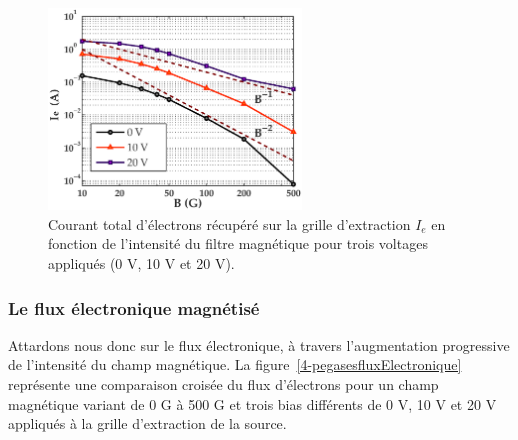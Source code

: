 \begin{refsection}
\begin{figure}[!htbp]
	\centering
	\includegraphics[width=0.6\textwidth]{figures/4-pegasesVarMagCourantParoi.eps}
	{\caption{Courant total d'électrons récupéré sur la grille d'extraction $I_e$
	en fonction de l'intensité du filtre magnétique pour trois voltages appliqués (0 V, 10 V et 20 V). }
	\label{pegasesVarMagCourantParoi}}
	\end{figure}

\subsubsection{Le flux électronique magnétisé}

Attardons nous donc sur le flux électronique, à travers l'augmentation
progressive de l'intensité du champ magnétique. La
figure~\ref{4-pegasesfluxElectronique} représente une comparaison croisée du
flux d'électrons pour un champ magnétique variant de 0 G à 500 G et trois bias
différents de 0 V, 10 V et 20 V appliqués à la grille d'extraction de la source. 


\end{refsection}
